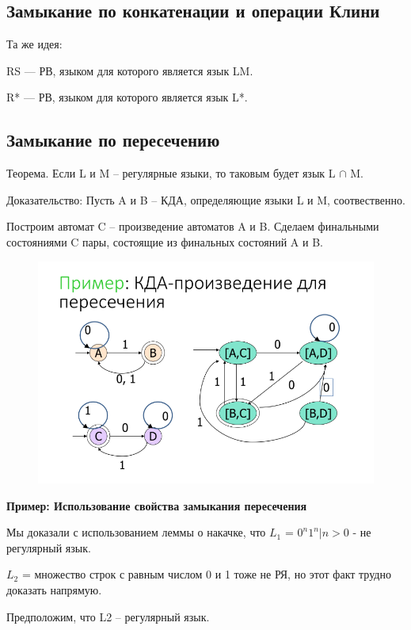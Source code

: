 \documentclass{article}
\begin{document}
\subsection{Замыкание по конкатенации и операции Клини}

Та же идея:

RS — РВ, языком для которого является язык LM.

R* — РВ, языком для которого является язык L*.


\subsection{Замыкание по пересечению}

Теорема. Если L и M – регулярные языки, то таковым
будет язык L $\cap $ M.

Доказательство: Пусть A и B – КДА, определяющие языки
L и M, соотвественно.

Построим автомат C – произведение автоматов A и B.
Сделаем финальными состояниями C пары, состоящие из
финальных состояний A и B.

\begin{figure}[H]
    \centering
    \includegraphics[width=1\linewidth]{Снимок экрана 2025-04-03 083957.png}
\end{figure}

\textbf{Пример: Использование свойства замыкания пересечения}


Мы доказали с использованием леммы о накачке, что
$L_1$ = {$0^n1^n | n > 0$} - не регулярный язык.

$L_2$ = множество строк с равным числом 0 и 1 тоже не
РЯ, но этот факт трудно доказать напрямую.

Предположим, что L2 – регулярный язык.
\end{document}
